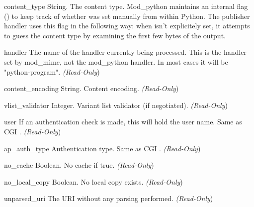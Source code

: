 \begin{memberdesc}[request]{content_type}
String. The content type. Mod_python maintains an internal flag
() to keep track of whether
 was set manually from within Python. The
publisher handler uses this flag in the following way: when
 isn't explicitely set, it attempts to guess the
content type by examining the first few bytes of the output.
\end{memberdesc}

\begin{memberdesc}[request]{handler}
The name of the handler currently being processed. This is the handler
set by mod_mime, not the mod_python handler. In most cases it will be
"python-program". \emph{(Read-Only})
\end{memberdesc}

\begin{memberdesc}[request]{content_encoding}
String. Content encoding.
\emph{(Read-Only})
\end{memberdesc}

\begin{memberdesc}[request]{vlist_validator}
Integer. Variant list validator (if negotiated).
\emph{(Read-Only})
\end{memberdesc}

\begin{memberdesc}[request]{user}
If an authentication check is made, this will hold the user
name. Same as CGI .
\emph{(Read-Only})
\end{memberdesc}

\begin{memberdesc}[request]{ap_auth_type}
Authentication type. Same as CGI .
\emph{(Read-Only})
\end{memberdesc}

\begin{memberdesc}[request]{no_cache}
Boolean. No cache if true.
\emph{(Read-Only})
\end{memberdesc}

\begin{memberdesc}[request]{no_local_copy}
Boolean. No local copy exists.
\emph{(Read-Only})
\end{memberdesc}

\begin{memberdesc}[request]{unparsed_uri}
The URI without any parsing performed.
\emph{(Read-Only})
\end{memberdesc}

